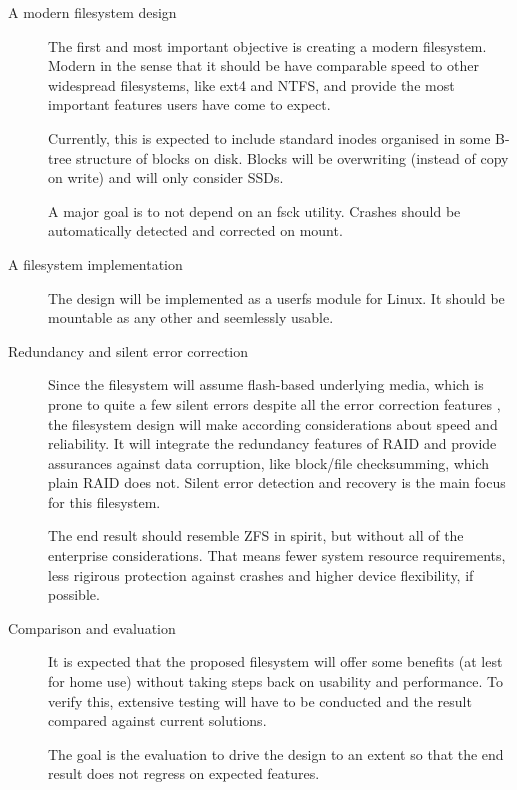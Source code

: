     \begin{description}
        \item[A modern filesystem design]

            The first and most important objective is creating a modern
            filesystem. Modern in the sense that it should be have comparable
            speed to other widespread filesystems, like ext4 and NTFS, and
            provide the most important features users have come to expect.

            Currently, this is expected to include standard inodes organised in
            some B-tree structure of blocks on disk. Blocks will be overwriting
            (instead of copy on write) and will only consider SSDs.

            A major goal is to not depend on an fsck utility. Crashes should be
            automatically detected and corrected on mount.

        \item[A filesystem implementation]

            The design will be implemented as a userfs module for Linux. It
            should be mountable as any other and seemlessly usable.

        \item[Redundancy and silent error correction]

            Since the filesystem will assume flash-based underlying media,
            which is prone to quite a few silent errors despite all the error
            correction features \cite{facebook_flash, google_flash}, the
            filesystem design will make according considerations about speed
            and reliability. It will integrate the redundancy features of RAID
            and provide assurances against data corruption, like block/file
            checksumming, which plain RAID does not. Silent error detection and
            recovery is the main focus for this filesystem.

            The end result should resemble ZFS in spirit, but without all of
            the enterprise considerations. That means fewer system resource
            requirements, less rigirous protection against crashes and higher
            device flexibility, if possible.

        \item[Comparison and evaluation]

            It is expected that the proposed filesystem will offer some
            benefits (at lest for home use) without taking steps back on
            usability and performance. To verify this, extensive testing will
            have to be conducted and the result compared against current
            solutions.

            The goal is the evaluation to drive the design to an extent so that
            the end result does not regress on expected features.

    \end{description}


